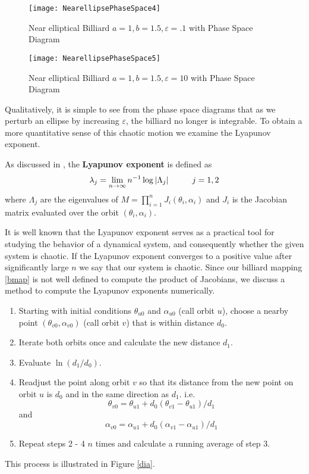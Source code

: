 \begin{figure}[h]
    \centering
    \texttt{[image: NearellipsePhaseSpace4]}
    \caption{Near elliptical Billiard $a=1, b=1.5, \varepsilon = .1$ with Phase Space Diagram}
    \label{nearellipse4}
\end{figure}
\begin{figure}[h]
    \centering
    \texttt{[image: NearellipsePhaseSpace5]}
    \caption{Near elliptical Billiard $a=1, b=1.5, \varepsilon = 10$ with Phase Space Diagram}
    \label{nearellipse5}
\end{figure}
Qualitatively, it is simple to see from the phase space diagrams that as we perturb an ellipse by increasing $\varepsilon$, the billiard no longer is integrable. To obtain a more quantitative sense of this chaotic motion we examine the Lyapunov exponent.
\begin{definition}
As discussed in \cite{Oliveira2010}, the \textbf{Lyapunov exponent} is defined as
\[
    \lambda_j = \lim_{n \rightarrow \infty} n^{-1} \log |\Lambda_j| \hspace{10mm} j = 1,2
\]
where $\Lambda_j$ are the eigenvalues of $M = \prod_{i = 1}^n J_i(\theta_i, \alpha_i)$ and $J_i$ is the Jacobian matrix evaluated over the orbit $(\theta_i, \alpha_i)$.
\end{definition}
It is well known that the Lyapunov exponent serves as a practical tool for studying the behavior of a dynamical system, and consequently whether the given system is chaotic. If the Lyapunov exponent converges to a positive value after significantly large $n$ we say that our system is chaotic. 
\newpage
Since our billiard mapping \ref{bmap} is not well defined to compute the product of Jacobians, we discuss a method to compute the Lyapunov exponents numerically. 
\begin{enumerate}
    \item Starting with initial conditions $\theta_{u0}$ and $\alpha_{u0}$ (call orbit $u$), choose a nearby point $(\theta_{v0}, \alpha_{v0})$ (call orbit $v$) that is within distance $d_0$.
    \item
    Iterate both orbits once and calculate the new distance $d_1$.
    \item
    Evaluate $\ln(d_1/d_0)$.
    \item
    Readjust the point along orbit $v$ so that its distance from the new point on orbit $u$ is $d_0$ and in the same direction as $d_1$. i.e.
    \[
        \theta_{v0} = \theta_{u1} + d_0(\theta_{v1} - \theta_{u1}) / d_1
    \] and
    \[
        \alpha_{v0} = \alpha_{u1} + d_0(\alpha_{v1} - \alpha_{u1}) / d_1
    \]
    \item Repeat steps 2 - 4 $n$ times and calculate a running average of step 3. 
\end{enumerate}
This process is illustrated in Figure \ref{dia}. 


